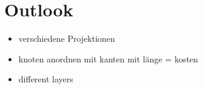 \documentclass
[
	paper = a4,
    pagesize,
	12 pt,
	oneside,                       %
    open = right,
	DIV = calc,
	BCOR = 0 mm,                   %
	bibtotoc
]
{scrbook}
\begin{document}
\chapter{Outlook}
\begin{itemize}
	\item verschiedene Projektionen
	\item knoten anordnen mit kanten mit länge = kosten
	\item different layers
\end{itemize}


%
%
%
%
%
%
\end{document}

